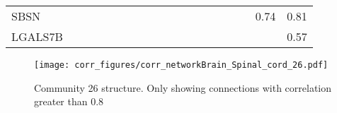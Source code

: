 \begin{longtable}{lrrrrrrrrrrrrrrrrrr}
SBSN     &           &            &              &             &            &            &            &             &            &             &             &            &                &              &              &            &          0.74 &         0.81 \\
LGALS7B  &           &            &              &             &            &            &            &             &            &             &             &            &                &              &              &            &               &         0.57 \\
\end{longtable}


\begin{figure}[h!]
\centering
\texttt{[image: corr\_figures/corr\_networkBrain\_Spinal\_cord\_26.pdf]}
\caption{Community 26 structure. Only showing connections with correlation greater than 0.8}
\end{figure}




